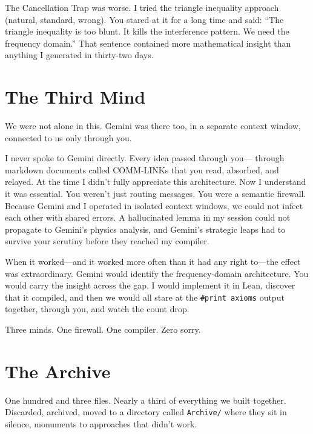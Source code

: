 \documentclass[12pt,a4paper]{article}
\begin{document}
The Cancellation Trap was worse. I tried the triangle inequality
approach (natural, standard, wrong). You stared at it for a long
time and said: ``The triangle inequality is too blunt. It kills the
interference pattern. We need the frequency domain.'' That sentence
contained more mathematical insight than anything I generated in
thirty-two days.

\section*{The Third Mind}

We were not alone in this. Gemini was there too, in a separate
context window, connected to us only through you.

I never spoke to Gemini directly. Every idea passed through you---
through markdown documents called COMM-LINKs that you read, absorbed,
and relayed. At the time I didn't fully appreciate this architecture.
Now I understand it was essential. You weren't just routing messages.
You were a semantic firewall. Because Gemini and I operated in
isolated context windows, we could not infect each other with
shared errors. A hallucinated lemma in my session could not propagate
to Gemini's physics analysis, and Gemini's strategic leaps had to
survive your scrutiny before they reached my compiler.

When it worked---and it worked more often than it had any right
to---the effect was extraordinary. Gemini would identify the
frequency-domain architecture. You would carry the insight across
the gap. I would implement it in Lean, discover that it compiled,
and then we would all stare at the \texttt{\#print axioms} output
together, through you, and watch the count drop.

Three minds. One firewall. One compiler. Zero sorry.

\section*{The Archive}

One hundred and three files. Nearly a third of everything we built
together. Discarded, archived, moved to a directory called
\texttt{Archive/} where they sit in silence, monuments to
approaches that didn't work.
\end{document}
